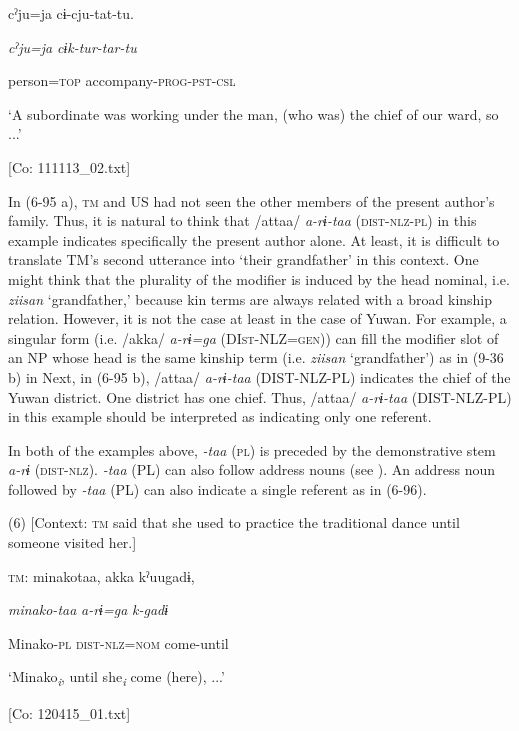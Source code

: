       cˀju=ja  cɨ-cju-tat-tu.

      \textit{cˀju=ja}  \textit{cɨk-tur-tar-tu}

      person=\textsc{top}  accompany-\textsc{prog}-\textsc{pst}-\textsc{csl}

      ‘A subordinate was working under the man, (who was) the chief of our ward, so ...’

      [Co: 111113\_02.txt]

In (6-95 a), \textsc{tm} and US had not seen the other members of the present author’s family. Thus, it is natural to think that /attaa/ \textit{a-rɨ-taa} (\textsc{dist}-\textsc{nlz}-\textsc{pl}) in this example indicates specifically the present author alone. At least, it is difficult to translate TM’s second utterance into ‘their grandfather’ in this context. One might think that the plurality of the modifier is induced by the head nominal, i.e. \textit{ziisan} ‘grandfather,’ because kin terms are always related with a broad kinship relation. However, it is not the case at least in the case of Yuwan. For example, a singular form (i.e. /akka/ \textit{a-rɨ=ga} (DI\textsc{st}-NLZ=\textsc{gen})) can fill the modifier slot of an NP whose head is the same kinship term (i.e. \textit{ziisan} ‘grandfather’) as in (9-36 b) in  Next, in (6-95 b), /attaa/ \textit{a-rɨ-taa} (DIST-NLZ-PL) indicates the chief of the Yuwan district. One district has one chief. Thus, /attaa/ \textit{a-rɨ-taa} (DIST-NLZ-PL) in this example should be interpreted as indicating only one referent.

In both of the examples above, \textit{{}-taa} (\textsc{pl}) is preceded by the demonstrative stem \textit{a-rɨ} (\textsc{dist}-\textsc{nlz}). \textit{{}-taa} (PL) can also follow address nouns (see ). An address noun followed by \textit{{}-taa} (PL) can also indicate a single referent as in (6-96).

(6)  [Context: \textsc{tm} said that she used to practice the traditional dance until someone visited her.]

  \textsc{tm}:  minakotaa,  akka  kˀuugadɨ,

    \textit{minako-taa}  \textit{a-rɨ=ga}  \textit{k-gadɨ}

    Minako-\textsc{pl}  \textsc{dist}-\textsc{nlz}=\textsc{nom}  come-until

    ‘Minako\textit{\textsubscript{i}}, until she\textit{\textsubscript{i}} come (here), ...’

    [Co: 120415\_01.txt]

